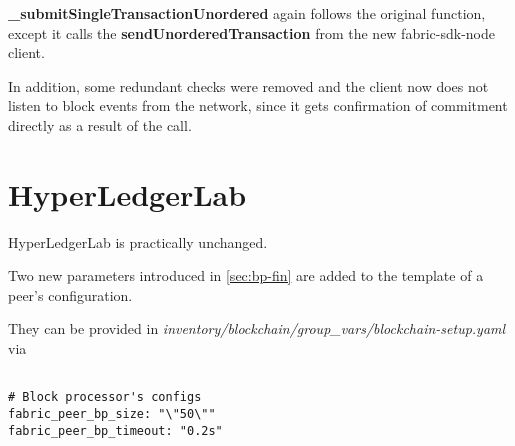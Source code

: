 \textbf{\_submitSingleTransactionUnordered} again follows the original function, except it calls the \textbf{sendUnorderedTransaction} from the new fabric-sdk-node client.

In addition, some redundant checks were removed and the client now does not listen to block events from the network, since it gets confirmation of commitment directly as a result of the call.

\section{HyperLedgerLab}\label{chapter:hll}

HyperLedgerLab is practically unchanged.

Two new parameters introduced in \ref{sec:bp-fin} are added to the template of a peer's configuration.

They can be provided in \textit{inventory/blockchain/group\_vars/blockchain-setup.yaml} via

\begin{lstlisting}

# Block processor's configs
fabric_peer_bp_size: "\"50\""
fabric_peer_bp_timeout: "0.2s"

\end{lstlisting}
